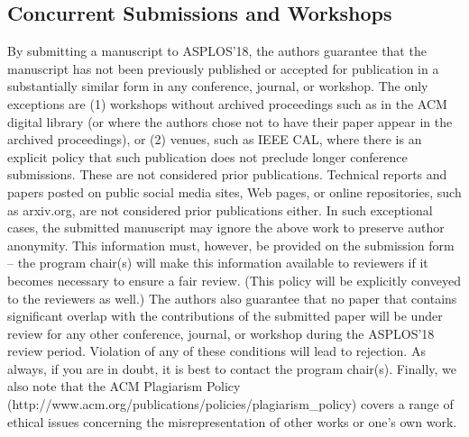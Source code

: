 \documentclass[pageno]{jpaper}
\begin{document}
\subsection{Concurrent Submissions and Workshops}

By submitting a manuscript to ASPLOS'18, the authors guarantee that the
manuscript has not been previously published or accepted for publication in
a substantially similar form in any conference, journal, or workshop. The
only exceptions are (1) workshops without archived proceedings such as in
the ACM digital library (or where the authors chose not to have their paper
appear in the archived proceedings), or (2) venues, such as IEEE CAL, where
there is an explicit policy that such publication does not preclude longer
conference submissions. These are not considered prior publications.
Technical reports and papers posted on public social media sites, Web pages,
or online repositories, such as arxiv.org, are not considered prior
publications either. In such exceptional cases, the submitted manuscript may
ignore the above work to preserve author anonymity. This information must,
however, be provided on the submission form -- the program chair(s) will
make this information available to reviewers if it becomes necessary to
ensure a fair review. (This policy will be explicitly conveyed to the
reviewers as well.)  The authors also guarantee that no paper that contains
significant overlap with the contributions of the submitted paper will be
under review for any other conference, journal, or workshop during the
ASPLOS'18 review period. Violation of any of these conditions will lead to
rejection.  As always, if you are in doubt, it is best to contact the
program chair(s).  Finally, we also note that the ACM Plagiarism Policy
(http://www.acm.org/publications/policies/plagiarism\_policy) covers a range
of ethical issues concerning the misrepresentation of other works or one's
own work.
\end{document}

